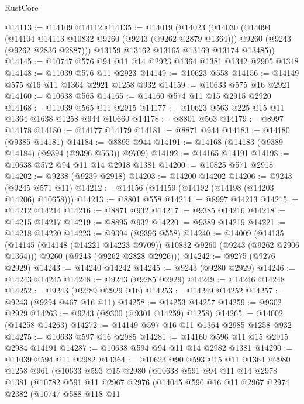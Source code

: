 \begin{lexlean}{RustCore}
\begin{coremodule}
@14113 := @14109 @14112
@14135 := @14019
    (@14023
      (@14030
        (@14094
          (@14104 @14113 @10832 @9260 (@9243 (@9262 @2879 @1364)))
          @9260
          (@9243 (@9262 @2836 @2887)))
        @13159
        @13162
        @13165
        @13169
        @13174
        @13485))
@14145 := @10747 @576 @94 @11 @14 @2923 @1364 @1381 @1342 @2905 @1348
@14148 := @11039 @576 @11 @2923
@14149 := @10623 @558
@14156 := @14149 @575 @16 @11 @1364 @2921 @1258 @932
@14159 := @10633 @575 @16 @2921
@14160 := @10638 @565
@14165 := @14160 @574 @11 @15 @2915 @2920
@14168 := @11039 @565 @11 @2915
@14177 := @10623 @563 @225 @15 @11 @1364 @1638 @1258 @944 @10660
@14178 := @8801 @563
@14179 := @8997 @14178
@14180 := @14177 @14179
@14181 := @8871 @944
@14183 := @14180 (@9385 @14181)
@14184 := @8895 @944
@14191 := @14168 (@14183 (@9389 @14184) (@9394 (@9396 @563)) @9709)
@14192 := @14165 @14191
@14198 := @10638 @572 @94 @11 @14 @2918 @1381
@14200 := @10825 @571 @2918
@14202 := @9238 (@9239 @2918)
@14203 := @14200 @14202
@14206 := @9243 (@9245 @571 @11)
@14212 := @14156 (@14159 (@14192 (@14198 (@14203 @14206) @10658)))
@14213 := @8801 @558
@14214 := @8997 @14213
@14215 := @14212 @14214
@14216 := @8871 @932
@14217 := @9385 @14216
@14218 := @14215 @14217
@14219 := @8895 @932
@14220 := @9389 @14219
@14221 := @14218 @14220
@14223 := @9394 (@9396 @558)
@14240 := @14009
    (@14135
      (@14145 (@14148 (@14221 @14223 @9709)) @10832 @9260 (@9243 (@9262 @2906 @1364)))
      @9260
      (@9243 (@9262 @2828 @2926)))
@14242 := @9275 (@9276 @2929)
@14243 := @14240 @14242
@14245 := @9243 (@9280 @2929)
@14246 := @14243 @14245
@14248 := @9243 (@9285 @2929)
@14249 := @14246 @14248
@14252 := @9243 (@9289 @2929 @16)
@14253 := @14249 @14252
@14257 := @9243 (@9294 @467 @16 @11)
@14258 := @14253 @14257
@14259 := @9302 @2929
@14263 := @9243 (@9300 (@9301 @14259) @1258)
@14265 := @14002 (@14258 @14263)
@14272 := @14149 @597 @16 @11 @1364 @2985 @1258 @932
@14275 := @10633 @597 @16 @2985
@14281 := @14160 @596 @11 @15 @2915 @2984 @14191
@14287 := @10638 @594 @94 @11 @14 @2982 @1381
@14290 := @11039 @594 @11 @2982
@14364 := @10623
    @90
    @593
    @15
    @11
    @1364
    @2980
    @1258
    @961
    (@10633
      @593
      @15
      @2980
      (@10638
        @591
        @94
        @11
        @14
        @2978
        @1381
        (@10782
          @591
          @11
          @2967
          @2976
          (@14045
            @590
            @16
            @11
            @2967
            @2974
            @2382
            (@10747
              @588
              @118
              @11

\end{coremodule}
\end{lexlean}
